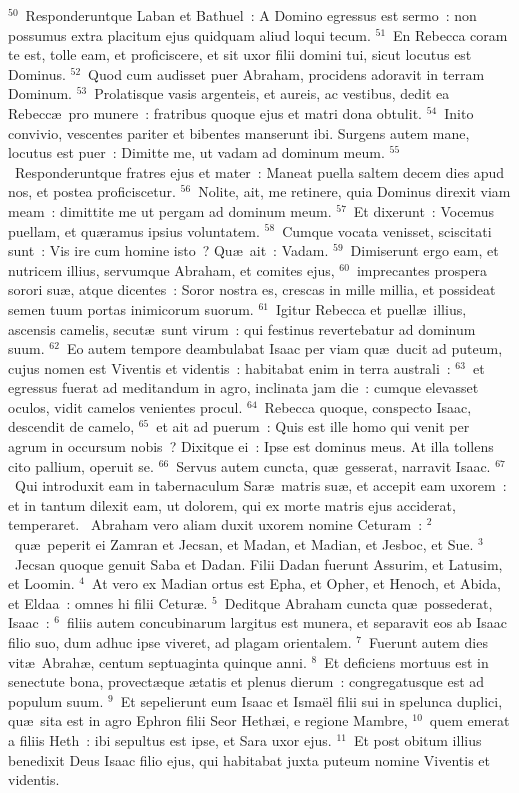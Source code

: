 ${}^{50}$~Responderuntque Laban et Bathuel~: A Domino egressus est sermo~: non possumus extra placitum ejus quidquam aliud loqui tecum.
${}^{51}$~En Rebecca coram te est, tolle eam, et proficiscere, et sit uxor filii domini tui, sicut locutus est Dominus.
${}^{52}$~Quod cum audisset puer Abraham, procidens adoravit in terram Dominum.
${}^{53}$~Prolatisque vasis argenteis, et aureis, ac vestibus, dedit ea Rebecc\ae\ pro munere~: fratribus quoque ejus et matri dona obtulit.
${}^{54}$~Inito convivio, vescentes pariter et bibentes manserunt ibi. Surgens autem mane, locutus est puer~: Dimitte me, ut vadam ad dominum meum.
${}^{55}$~Responderuntque fratres ejus et mater~: Maneat puella saltem decem dies apud nos, et postea proficiscetur.
${}^{56}$~Nolite, ait, me retinere, quia Dominus direxit viam meam~: dimittite me ut pergam ad dominum meum.
${}^{57}$~Et dixerunt~: Vocemus puellam, et qu\ae ramus ipsius voluntatem.
${}^{58}$~Cumque vocata venisset, sciscitati sunt~: Vis ire cum homine isto~? Qu\ae\ ait~: Vadam.
${}^{59}$~Dimiserunt ergo eam, et nutricem illius, servumque Abraham, et comites ejus,
${}^{60}$~imprecantes prospera sorori su\ae , atque dicentes~: Soror nostra es, crescas in mille millia, et possideat semen tuum portas inimicorum suorum.
${}^{61}$~Igitur Rebecca et puell\ae\ illius, ascensis camelis, secut\ae\ sunt virum~: qui festinus revertebatur ad dominum suum.
${}^{62}$~Eo autem tempore deambulabat Isaac per viam qu\ae\ ducit ad puteum, cujus nomen est Viventis et videntis~: habitabat enim in terra australi~:
${}^{63}$~et egressus fuerat ad meditandum in agro, inclinata jam die~: cumque elevasset oculos, vidit camelos venientes procul.
${}^{64}$~Rebecca quoque, conspecto Isaac, descendit de camelo,
${}^{65}$~et ait ad puerum~: Quis est ille homo qui venit per agrum in occursum nobis~? Dixitque ei~: Ipse est dominus meus. At illa tollens cito pallium, operuit se.
${}^{66}$~Servus autem cuncta, qu\ae\ gesserat, narravit Isaac.
${}^{67}$~Qui introduxit eam in tabernaculum Sar\ae\ matris su\ae , et accepit eam uxorem~: et in tantum dilexit eam, ut dolorem, qui ex morte matris ejus acciderat, temperaret.
~Abraham vero aliam duxit uxorem nomine Ceturam~:
${}^{2}$~qu\ae\ peperit ei Zamran et Jecsan, et Madan, et Madian, et Jesboc, et Sue.
${}^{3}$~Jecsan quoque genuit Saba et Dadan. Filii Dadan fuerunt Assurim, et Latusim, et Loomin.
${}^{4}$~At vero ex Madian ortus est Epha, et Opher, et Henoch, et Abida, et Eldaa~: omnes hi filii Cetur\ae .
${}^{5}$~Deditque Abraham cuncta qu\ae\ possederat, Isaac~:
${}^{6}$~filiis autem concubinarum largitus est munera, et separavit eos ab Isaac filio suo, dum adhuc ipse viveret, ad plagam orientalem.
${}^{7}$~Fuerunt autem dies vit\ae\ Abrah\ae , centum septuaginta quinque anni.
${}^{8}$~Et deficiens mortuus est in senectute bona, provect\ae que \ae tatis et plenus dierum~: congregatusque est ad populum suum.
${}^{9}$~Et sepelierunt eum Isaac et Isma\"el filii sui in spelunca duplici, qu\ae\ sita est in agro Ephron filii Seor Heth\ae i, e regione Mambre,
${}^{10}$~quem emerat a filiis Heth~: ibi sepultus est ipse, et Sara uxor ejus.
${}^{11}$~Et post obitum illius benedixit Deus Isaac filio ejus, qui habitabat juxta puteum nomine Viventis et videntis.


